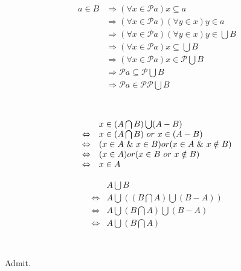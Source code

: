 \section{}
\[ \begin{array}{rl}
  a \in B
  & \Rightarrow (\forall x \in \mathscr{P}a) x \subseteq a \\
  & \Rightarrow (\forall x \in \mathscr{P}a)(\forall y \in x) y \in a \\
  & \Rightarrow (\forall x \in \mathscr{P}a)(\forall y \in x) y \in \bigcup B \\
  & \Rightarrow (\forall x \in \mathscr{P}a) x \subseteq \bigcup B \\
  & \Rightarrow (\forall x \in \mathscr{P}a) x \in \mathscr{P}\bigcup B \\
  & \Rightarrow \mathscr{P}a \subseteq \mathscr{P}\bigcup B \\
  & \Rightarrow \mathscr{P}a \in \mathscr{PP}\bigcup B \\
\end{array}\]


\section{}
\[ \begin{array}{rl}
                  & x \in (A\bigcap B)\bigcup (A-B) \\
  \Leftrightarrow & x \in (A\bigcap B) \ \mathnormal{or}\ x \in (A-B) \\
  \Leftrightarrow & (x\in A\ \&\ x\in B)\mathnormal{or}(x\in A\ \&\ x\notin B) \\
  \Leftrightarrow & (x\in A)\mathnormal{or}(x\in B\ \mathnormal{or}\ x\notin B) \\
  \Leftrightarrow & x\in A
\end{array}\]

\[ \begin{array}{rl}
                  & A \bigcup B \\
  \Leftrightarrow & A \bigcup ((B\bigcap A)\bigcup(B-A)) \\
  \Leftrightarrow & A \bigcup (B\bigcap A) \bigcup(B-A) \\
  \Leftrightarrow & A \bigcup (B\bigcap A) \\
\end{array}\]


\section{}
Admit.


